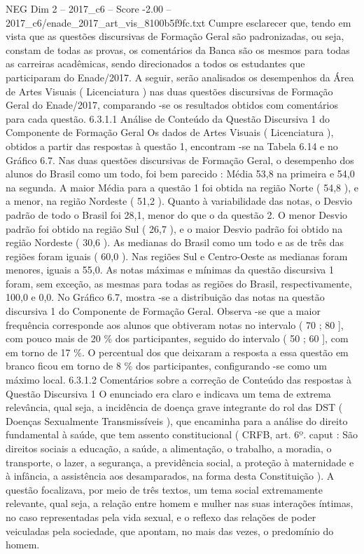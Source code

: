 \begin{textsample}{NEG Dim 2 – 2017\_c6 – Score -2.00 – 2017\_c6/enade\_2017\_art\_vis\_8100b5f9fc.txt}
Cumpre esclarecer que, tendo em vista que as questões discursivas de Formação Geral são padronizadas, ou seja, constam de todas as provas, os comentários da Banca são os mesmos para todas as carreiras acadêmicas, sendo direcionados a todos os estudantes que participaram do Enade/2017.
A seguir, serão analisados os desempenhos da Área de Artes Visuais ( Licenciatura ) nas duas questões discursivas de Formação Geral do Enade/2017, comparando -se os resultados obtidos com comentários para cada questão. 6.3.1.1 Análise de Conteúdo da Questão Discursiva 1 do Componente de Formação Geral Os dados de Artes Visuais ( Licenciatura ), obtidos a partir das respostas à questão 1, encontram -se na Tabela 6.14 e no Gráfico 6.7.
Nas duas questões discursivas de Formação Geral, o desempenho dos alunos do Brasil como um todo, foi bem parecido : Média 53,8 na primeira e 54,0 na segunda.
A maior Média para a questão 1 foi obtida na região Norte ( 54,8 ), e a menor, na região Nordeste ( 51,2 ).
Quanto à variabilidade das notas, o Desvio padrão de todo o Brasil foi 28,1, menor do que o da questão 2.
O menor Desvio padrão foi obtido na região Sul ( 26,7 ), e o maior Desvio padrão foi obtido na região Nordeste ( 30,6 ).
As medianas do Brasil como um todo e as de três das regiões foram iguais ( 60,0 ).
Nas regiões Sul e Centro-Oeste as medianas foram menores, iguais a 55,0.
As notas máximas e mínimas da questão discursiva 1 foram, sem exceção, as mesmas para todas as regiões do Brasil, respectivamente, 100,0 e 0,0.
No Gráfico 6.7, mostra -se a distribuição das notas na questão discursiva 1 do Componente de Formação Geral.
Observa -se que a maior frequência corresponde aos alunos que obtiveram notas no intervalo ( 70 ; 80 ], com pouco mais de 20 \% dos participantes, seguido do intervalo ( 50 ; 60 ], com em torno de 17 \%.
O percentual dos que deixaram a resposta a essa questão em branco ficou em torno de 8 \% dos participantes, configurando -se como um máximo local. 6.3.1.2 Comentários sobre a correção de Conteúdo das respostas à Questão Discursiva 1 O enunciado era claro e indicava um tema de extrema relevância, qual seja, a incidência de doença grave integrante do rol das DST ( Doenças Sexualmente Transmissíveis ), que encaminha para a análise do direito fundamental à saúde, que tem assento constitucional ( CRFB, art. 6º. caput : São direitos sociais a educação, a saúde, a alimentação, o trabalho, a moradia, o transporte, o lazer, a segurança, a previdência social, a proteção à maternidade e à infância, a assistência aos desamparados, na forma desta Constituição ).
A questão focalizava, por meio de três textos, um tema social extremamente relevante, qual seja, a relação entre homem e mulher nas suas interações íntimas, no caso representadas pela vida sexual, e o reflexo das relações de poder veiculadas pela sociedade, que apontam, no mais das vezes, o predomínio do homem.

\end{textsample}
